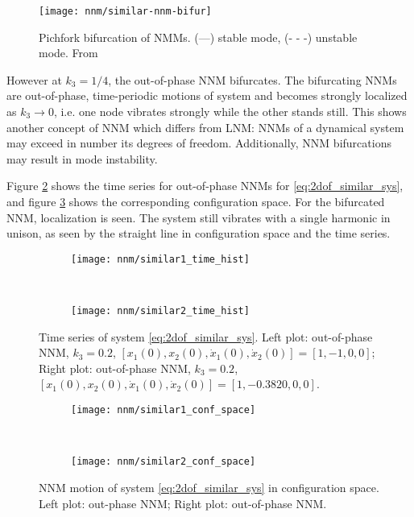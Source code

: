 \begin{figure}[!ht]
  \centering
  \texttt{[image: nnm/similar-nnm-bifur]}
  \caption{Pichfork bifurcation of NMMs. (---) stable mode, (- - -) unstable
    mode. From \citep{vakakis1992a}}
  \label{fig:nnm_similar_bifur}
\end{figure}


However at $k_3 = 1/4$, the out-of-phase NNM bifurcates. The bifurcating NNMs are
out-of-phase, time-periodic motions of system and becomes strongly localized as
$k_3 \to 0$, i.e. one node vibrates strongly while the other stands still. This
shows another concept of NNM which differs from LNM: NNMs of a dynamical system
may exceed in number its degrees of freedom. Additionally, NNM bifurcations may
result in mode instability.


Figure \ref{fig:similar_time_series} shows the time series for out-of-phase NNMs
for \eqref{eq:2dof_similar_sys}, and figure \ref{fig:similar_nnm_config} shows
the corresponding configuration space. For the bifurcated NNM, localization is
seen. The system still vibrates with a single harmonic in unison, as seen by the
straight line in configuration space and the time series.

\begin{figure}[!ht]
  \centering
  \begin{subfigure}[b]{0.45\textwidth}
    \texttt{[image: nnm/similar1\_time\_hist]}
  \end{subfigure}
  ~
  \begin{subfigure}[b]{0.45\textwidth}
    \texttt{[image: nnm/similar2\_time\_hist]}
  \end{subfigure}
  \caption{Time series of system \eqref{eq:2dof_similar_sys}.
    Left plot: out-of-phase NNM, $k_3=0.2$,
    $[x_1(0), x_2(0), \dot x_1(0), \dot x_2(0)] = [1,-1,0,0]$;
    Right plot: out-of-phase NNM, $k_3=0.2$,
    $[x_1(0), x_2(0), \dot x_1(0), \dot x_2(0)] = [1, -0.3820,0,0]$.}
  \label{fig:similar_time_series}
\end{figure}


\begin{figure}[!ht]
  \centering
  \begin{subfigure}[b]{0.45\textwidth}
    \texttt{[image: nnm/similar1\_conf\_space]}
  \end{subfigure}
  ~
  \begin{subfigure}[b]{0.45\textwidth}
    \texttt{[image: nnm/similar2\_conf\_space]}
  \end{subfigure}
  \caption{NNM motion of system \eqref{eq:2dof_similar_sys} in configuration space.
    Left plot: out-phase NNM;
    Right plot: out-of-phase NNM.}
  \label{fig:similar_nnm_config}
\end{figure}


